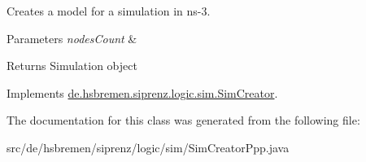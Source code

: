 Creates a model for a simulation in ns-\/3. 


\begin{DoxyParams}{Parameters}
{\em nodes\+Count} & \\
\hline
\end{DoxyParams}
\begin{DoxyReturn}{Returns}
Simulation object 
\end{DoxyReturn}


Implements \hyperlink{interfacede_1_1hsbremen_1_1siprenz_1_1logic_1_1sim_1_1SimCreator_af31c0bd004b2b100d9fd2e413cdaeac0}{de.\+hsbremen.\+siprenz.\+logic.\+sim.\+Sim\+Creator}.



The documentation for this class was generated from the following file\+:\begin{DoxyCompactItemize}
\item 
src/de/hsbremen/siprenz/logic/sim/Sim\+Creator\+Ppp.\+java\end{DoxyCompactItemize}
